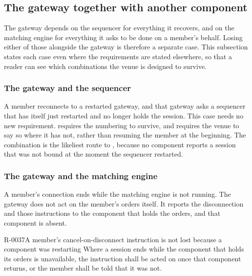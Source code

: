 \subsection{The gateway together with another component}
\label{sec:ha:disabled:gw_and_others}

The gateway depends on the sequencer for everything it recovers, and on the
matching engine for everything it asks to be done on a member's behalf. Losing
either of those alongside the gateway is therefore a separate case. This
subsection states each case even where the requirements are stated elsewhere, so
that a reader can see which combinations the venue is designed to survive.

\subsubsection{The gateway and the sequencer}
\label{sec:ha:disabled:gw_and_seq}

A member reconnects to a restarted gateway, and that gateway asks a sequencer
that has itself just restarted and no longer holds the session. This case needs
no new requirement.  requires the numbering to survive, and
 requires the venue to say so where it has not, rather than
resuming the member at the beginning. The combination is the likeliest route to
, because no component reports a session that was not bound at the
moment the sequencer restarted.

\subsubsection{The gateway and the matching engine}
\label{sec:ha:disabled:gw_and_me}

A member's connection ends while the matching engine is not running. The gateway
does not act on the member's orders itself. It reports the disconnection and those instructions to the component that holds
the orders, and that component is absent.

\begin{requirement}{R-0037}{A member's cancel-on-disconnect instruction is not lost because a component was restarting}
  Where a session ends while the component that holds its orders is unavailable,
  the instruction shall be acted on once that component returns, or the member
  shall be told that it was not.
\end{requirement}
